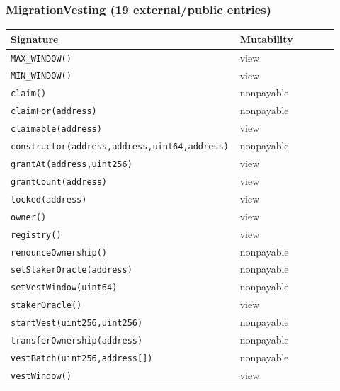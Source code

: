 \subsubsection*{MigrationVesting \;\normalfont\small(19 external/public entries)}
\begin{longtable}{@{}p{0.62\linewidth}p{0.30\linewidth}@{}}
\toprule \textbf{Signature} & \textbf{Mutability} \\ \midrule \endhead
\texttt{\scriptsize MAX\_WINDOW()} & view \\
\texttt{\scriptsize MIN\_WINDOW()} & view \\
\texttt{\scriptsize claim()} & nonpayable \\
\texttt{\scriptsize claimFor(address)} & nonpayable \\
\texttt{\scriptsize claimable(address)} & view \\
\texttt{\scriptsize constructor(address,address,uint64,address)} & nonpayable \\
\texttt{\scriptsize grantAt(address,uint256)} & view \\
\texttt{\scriptsize grantCount(address)} & view \\
\texttt{\scriptsize locked(address)} & view \\
\texttt{\scriptsize owner()} & view \\
\texttt{\scriptsize registry()} & view \\
\texttt{\scriptsize renounceOwnership()} & nonpayable \\
\texttt{\scriptsize setStakerOracle(address)} & nonpayable \\
\texttt{\scriptsize setVestWindow(uint64)} & nonpayable \\
\texttt{\scriptsize stakerOracle()} & view \\
\texttt{\scriptsize startVest(uint256,uint256)} & nonpayable \\
\texttt{\scriptsize transferOwnership(address)} & nonpayable \\
\texttt{\scriptsize vestBatch(uint256,address[])} & nonpayable \\
\texttt{\scriptsize vestWindow()} & view \\
\bottomrule\end{longtable}

